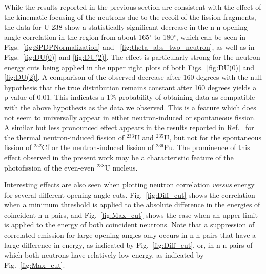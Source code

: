 \label{sec:anomaly}
While the results reported in the previous section are consistent with the effect of the kinematic focusing of the neutrons due to the recoil of the fission fragments, the data for U-238 show a statistically significant decrease in the n-n opening angle correlation in the region from about 165$^{\circ}$ to 180$^{\circ}$, which can be seen in Figs.~\ref{fig:SPDPNormalization} and ~\ref{fig:theta_abs_two_neutron}, as well as in Figs.~\ref{fig:DU(0)} and \ref{fig:DU(2)}.
The effect is particularly strong for the neutron energy cuts being applied in the upper right plots of both Figs.~\ref{fig:DU(0)} and \ref{fig:DU(2)}.
A comparison of the observed decrease after 160 degrees with the null hypothesis that the true distribution remains constant after 160 degrees yields a p-value of 0.01.
This indicates a 1\% probability of obtaining data as compatible with the above hypothesis as the data we observed.
This is a feature which does not seem to universally appear in either neutron-induced or spontaneous fission.
A similar but less pronounced effect appears in the results reported in Ref.~\cite{Sokolov2010} for the thermal neutron-induced fission of $^{233}$U and $^{235}$U, but not for the spontaneous fission of $^{252}$Cf or the neutron-induced fission of $^{239}$Pu.
The prominence of this effect observed in the present work may be a characteristic feature of the photofission of the even-even $^{238}$U nucleus.

Interesting effects are also seen when plotting neutron correlation \textit{versus} energy for several different opening angle cuts.
Fig.~\ref{fig:Diff_cut} shows the correlation when a minimum threshold is applied to the absolute difference in the energies of coincident n-n pairs, and Fig.~\ref{fig:Max_cut} shows the case when an upper limit is applied to the energy of both coincident neutrons.
Note that a suppression of correlated emission for large opening angles only occurs in n-n pairs that have a large difference in energy, as indicated by Fig.~\ref{fig:Diff_cut}, or, in n-n pairs of which both neutrons have relatively low energy, as indicated by Fig.~\ref{fig:Max_cut}.

